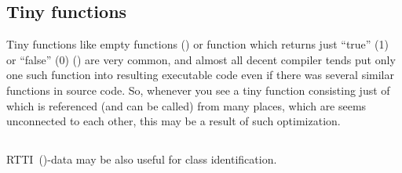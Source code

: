\subsection{Tiny functions}

Tiny functions like empty functions ()
or function which returns just ``true'' (1) or ``false'' (0) () are very common,
and almost all decent compiler tends put only one such function into resulting executable code even if there was several
similar functions in source code.
So, whenever you see a tiny function consisting just of 
which is referenced (and can be called) from many places,
which are seems unconnected to each other, this may be a result of such optimization.%

\subsection{\Cpp}

\ac{RTTI}~()-data may be also useful for \Cpp class identification.

